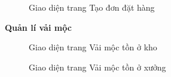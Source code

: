\begin{figure}[H]
    \begin{center}
        \caption{Giao diện trang Tạo đơn đặt hàng}
        \label{result_tao_don_hang}
    \end{center}
\end{figure}

\textbf{Quản lí vải mộc}

\begin{figure}[H]
    \begin{center}
        \caption{Giao diện trang Vải mộc tồn ở kho}
        \label{result_moc_ton_kho}
    \end{center}
\end{figure}

\begin{figure}[H]
    \begin{center}
        \caption{Giao diện trang Vải mộc tồn ở xưởng}
        \label{result_moc_ton_xuong}
    \end{center}
\end{figure}

